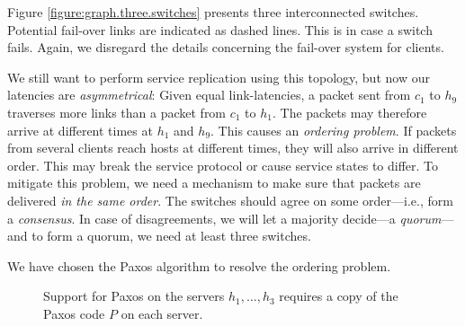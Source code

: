 Figure \vref{figure:graph.three.switches} presents three interconnected
switches.
%
Potential fail-over links are indicated as dashed lines.  This is in case
a switch fails.  Again, we disregard the details concerning the fail-over
system for clients.

We still want to perform service replication using this topology, but now our
latencies are \textit{asymmetrical}:
%
Given equal link-latencies, a packet sent from $c_1$ to $h_9$ traverses more links than a packet from
$c_1$ to $h_1$.  The packets may therefore
arrive at different times at $h_1$ and $h_9$.
%
This causes an \textit{ordering problem}. If packets from several clients
reach hosts at different times, they will also arrive in different order.
This may break the service protocol or cause service states to differ.
%
To mitigate this problem, we need a mechanism to make sure that packets are
delivered \textit{in the same order}.
%
The switches should agree on some order---i.e., form a \textit{consensus}.
In case of disagreements, we will let a majority decide---a
\textit{quorum}---and to form a quorum, we need at least three switches.

We have chosen the Paxos algorithm to resolve the ordering problem.

\begin{figure}[H]
  \centering
  \caption{Support for Paxos on the servers $h_1, \dots, h_3$ requires a
    copy of the Paxos code $P$ on each server.}
  \label{figure:paxos.on.servers}
\end{figure}

